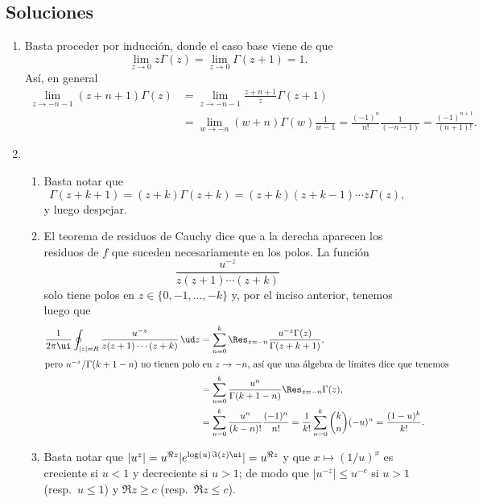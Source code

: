 \documentclass[11pt, reqno]{amsart}
\begin{document}
\begin{additional}
\printbibliography

\newpage
\section{Soluciones}
\begin{enumerate}
	\item Basta proceder por inducción, donde el caso base viene de que
		\[
			\lim_{z\to 0} z\Gamma(z) = \lim_{z\to 0} \Gamma(z + 1) = 1.
		\]
		Así, en general
		\begin{align*}
			\lim_{z \to -n-1} (z + n+1)\Gamma(z) &= \lim_{z\to -n-1} \frac{z + n + 1}{z} \Gamma(z + 1) \\
							     &= \lim_{w\to -n} (w + n)\Gamma(w) \frac{1}{w - 1}
							     = \frac{(-1)^n}{n!} \frac{1}{(-n-1)} = \frac{(-1)^{n+1}}{(n+1)!}.
		\end{align*}

	\item
		\begin{enumerate}
			\item Basta notar que
				\[
					\Gamma(z + k + 1) = (z + k) \Gamma(z + k) = (z + k)(z + k - 1) \cdots z \Gamma(z),
				\]
				y luego despejar.

			\item El teorema de residuos de Cauchy dice que a la derecha aparecen los residuos de $f$ que suceden necesariamente
				en los polos.
				La función
				\[
					\frac{u^{-z}}{z(z + 1)\cdots(z + k)}
				\]
				solo tiene polos en $z \in \{ 0, -1, \dots, -k \}$ y, por el inciso anterior, tenemos luego que
				\begin{align*}
					\frac{1}{2\pi\ui}\oint_{|z|=R} \frac{u^{-z}}{z(z + 1)\cdots(z + k)} \, \ud z
					&= \sum_{n=0}^{k} \Res_{z=-n} \frac{u^{-z}\Gamma(z)}{\Gamma(z + k + 1)}, \\
					\intertext{pero $u^{-z}/\Gamma(k + 1 - n)$ no tienen polo en $z \to -n$, así que una álgebra de límites dice
					que tenemos}
					&= \sum_{n=0}^{k} \frac{u^n}{\Gamma(k + 1 - n)} \Res_{z=-n}\Gamma(z), \\
					&= \sum_{n=0}^{k} \frac{u^n}{(k - n)!} \frac{(-1)^n}{n!} = \frac{1}{k!}
					\sum_{n=0}^{k}\binom{k}{n} (-u)^n = \frac{(1 - u)^k}{k!}.
				\end{align*}

			\item Basta notar que $|u^z| = u^{\Re z}|e^{\log(u)\Im(z)\ui}| = u^{\Re z}$ y que $x \mapsto (1/u)^x$ es creciente
				si $u < 1$ y decreciente si $u > 1$;
				de modo que $|u^{-z}| \le u^{-c}$ si $u > 1$ (resp.\ $u \le 1$) y $\Re z \ge c$ (resp.\ $\Re z \le c$).


\end{enumerate}
\end{enumerate}
\end{additional}
\end{document}
